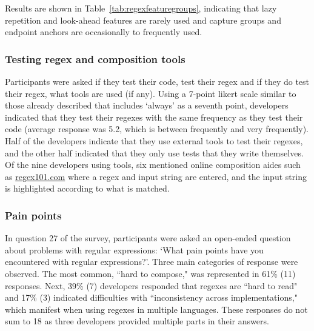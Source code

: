 Results are shown in Table~\ref{tab:regexfeaturegroups}, indicating that lazy repetition and look-ahead features are rarely used and capture groups and endpoint anchors are occasionally to frequently used.

\subsubsection{Testing regex and composition tools}

Participants were asked if they test their code, test their regex and if they do test their regex, what tools are used (if any).  Using a 7-point likert scale similar to those already described that includes `always' as a seventh point, developers indicated that they test their regexes with the same frequency as they test their code (average response was 5.2, which is between frequently and very frequently).  Half of the  developers indicate that they use external tools to test their regexes, and the other half indicated that they only use tests that they write themselves. Of the nine developers using tools, six mentioned online composition aides such as \url{regex101.com} where a regex and input string are entered, and the input string is highlighted according to what is matched.

\subsubsection{Pain points}
\label{sec:painPoints}
In question 27 of the survey, participants were asked an open-ended question about problems with regular expressions: `What pain points have you encountered with regular expressions?'.  Three main categories of response were observed. The most common, ``hard to compose," was represented in 61\% (11) responses. Next, 39\% (7) developers responded that regexes are ``hard to read" and 17\% (3) indicated difficulties with ``inconsistency across implementations," which manifest when using regexes in multiple languages. These responses do not sum to 18 as three developers provided multiple parts in their answers.


